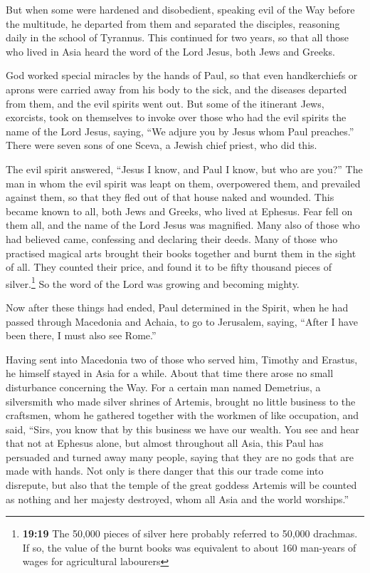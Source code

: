  But when some were hardened and disobedient, speaking
evil of the Way before the multitude, he departed from them and
separated the disciples, reasoning daily in the school of Tyrannus.
 This continued for two years, so that all those who
lived in Asia heard the word of the Lord Jesus, both Jews and Greeks.

 God worked special miracles by the hands of Paul,
 so that even handkerchiefs or aprons were carried away
from his body to the sick, and the diseases departed from them, and the
evil spirits went out.  But some of the itinerant Jews,
exorcists, took on themselves to invoke over those who had the evil
spirits the name of the Lord Jesus, saying, ``We adjure you by Jesus
whom Paul preaches.''  There were seven sons of one
Sceva, a Jewish chief priest, who did this.

 The evil spirit answered, ``Jesus I know, and Paul I
know, but who are you?''  The man in whom the evil spirit
was leapt on them, overpowered them, and prevailed against them, so that
they fled out of that house naked and wounded.  This
became known to all, both Jews and Greeks, who lived at Ephesus. Fear
fell on them all, and the name of the Lord Jesus was magnified.
 Many also of those who had believed came, confessing and
declaring their deeds.  Many of those who practised
magical arts brought their books together and burnt them in the sight of
all. They counted their price, and found it to be fifty thousand pieces
of silver.\footnote{\textbf{19:19} The 50,000 pieces of silver here
  probably referred to 50,000 drachmas. If so, the value of the burnt
  books was equivalent to about 160 man-years of wages for agricultural
  labourers}  So the word of the Lord was growing and
becoming mighty.

 Now after these things had ended, Paul determined in the
Spirit, when he had passed through Macedonia and Achaia, to go to
Jerusalem, saying, ``After I have been there, I must also see Rome.''

 Having sent into Macedonia two of those who served him,
Timothy and Erastus, he himself stayed in Asia for a while.
 About that time there arose no small disturbance
concerning the Way.  For a certain man named Demetrius, a
silversmith who made silver shrines of Artemis, brought no little
business to the craftsmen,  whom he gathered together
with the workmen of like occupation, and said, ``Sirs, you know that by
this business we have our wealth.  You see and hear that
not at Ephesus alone, but almost throughout all Asia, this Paul has
persuaded and turned away many people, saying that they are no gods that
are made with hands.  Not only is there danger that this
our trade come into disrepute, but also that the temple of the great
goddess Artemis will be counted as nothing and her majesty destroyed,
whom all Asia and the world worships.''

